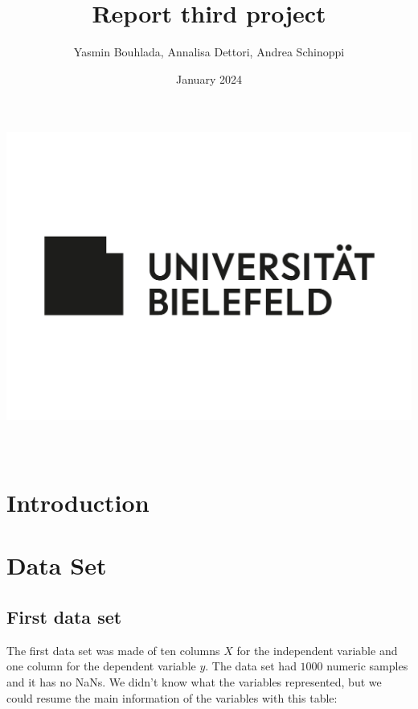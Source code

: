 \documentclass[a4paper,oneside,12pt]{article}
\author{Yasmin Bouhlada, Annalisa Dettori, Andrea Schinoppi}
\title{Report third project}
\date{January 2024}
\begin{document}
\makeatletter
    \begin{titlepage}
        \begin{center}
            \includegraphics[width=0.7\linewidth]{Bielefeld_University.png}\\[4ex]
            {\huge \bfseries  \@title }\\[2ex] 
            {\large  \@author}\\[50ex] 
            {\large \@date}
        \end{center}
    \end{titlepage}
\makeatother
\thispagestyle{empty}
\newpage

\section{Introduction}

\section{Data Set}

\subsection{First data set}

The first data set was made of ten columns $X$ for the independent variable and one column for the dependent variable $y$. The data set had $1000$ numeric samples and it has no NaNs. We didn't know what the variables represented, but we could resume the main information of the variables with this table:  
\end{document}
